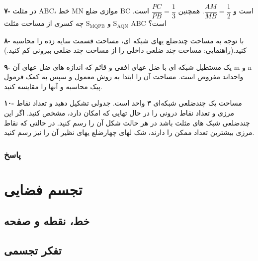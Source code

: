 \documentclass[12pt, a4paper, twoside]{book}
\begin{document}
\begin{multicols}{2}
\textbf{۷-}
در مثلث ABC، خط MN موازی ضلع BC است و 
$ \dfrac{AM}{MB} = \dfrac{1}{2} $.
همچنین 
$ \dfrac{PC}{PB} = \dfrac{1}{3} $
است. 
$ \mathrm{S}_{\mathrm{AQN}} $ و $\mathrm{S}_{\mathrm{MQPB}}$
چه کسری از مساحت مثلث ABC است؟

\bigskip
\textbf{۸-}
با توجه به مساحت چندضلع یهای شبکه ای، مساحت قسمت سایه زده را محاسبه کنید.(راهنمایی: مساحت چند ضلعی داخلی را از مساحت چند ضلعی بیرونی کم کنید.)

\bigskip
\textbf{۹-}
یک مستطیل شبکه ای با ضل عهای افقی و قائم که اندازه های ضل عهای آن m و n واحداند مفروض است. مساحت آن را ابتدا به روش معمول و سپس به کمک فرمول پیک محاسبه و آنها را مقایسه کنید.

\bigskip
\textbf{۱۰-}
مساحت یک چندضلعی شبکه‌ای ۳ واحد است. جدولی تشکیل دهید و تعداد نقاط مرزی و تعداد نقاط درونی را در حال تهایی که امکان دارد، مشخص کنید. اگر این چندضلعی شبک های مثلث باشد در هر حالت شکل آن را رسم کنید. در حالتی که نقاط مرزی بیشترین تعداد ممکن را دارند، شک لهای چهارضلع یهای نظیر آن را نیز رسم کنید.

\end{multicols}

\newpage

\subsection{پاسخ}
\chapter{تجسم فضایی}

\section{خط، نقطه و صفحه}

\section{تفکر تجسمی}
	
\end{document}
